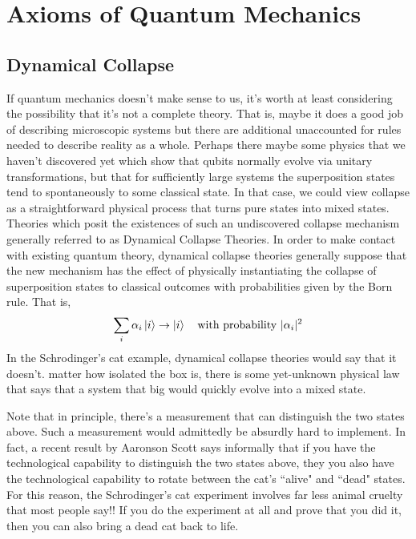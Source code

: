 \chapter{Axioms of Quantum Mechanics}
\section{Dynamical Collapse}
If quantum mechanics doesn't make sense to us, it's worth at least considering the possibility that it's not a complete theory. That is, maybe it does a good job of describing microscopic systems but there are additional unaccounted for rules needed to describe reality as a whole. Perhaps there maybe some physics that we haven't discovered yet which show that qubits normally evolve via unitary transformations, but that for sufficiently large systems the superposition states tend to spontaneously to some classical state. In that case, we could view collapse as a straightforward physical process that turns pure states into mixed states. Theories which posit the existences of such an undiscovered collapse mechanism generally referred to as Dynamical Collapse Theories. In order to make contact with existing quantum theory, dynamical collapse theories generally suppose that the new mechanism has the effect of physically instantiating the collapse of superposition states to classical outcomes with probabilities given by the Born rule. That is,
\[
\sum_i\alpha_i\ket{i}\rightarrow \ket{i}\quad \text{with probability $|\alpha_i|^2$}
\]
In the Schrodinger's cat example, dynamical collapse theories would say that it doesn't. matter how isolated the box is, there is some yet-unknown physical law that says that a system that big would quickly evolve into a mixed state.

Note that in principle, there's a measurement that can distinguish the two states above. Such a measurement would admittedly be absurdly hard to implement. In fact, a recent result by Aaronson Scott says informally that if you have the technological capability to distinguish the two states above, they you also have the technological capability to rotate between the cat's ``alive" and ``dead" states. For this reason, the Schrodinger's cat experiment involves far less animal cruelty that most people say!! If you do the experiment at all and prove that you did it, then you can also bring a dead cat back to life.

